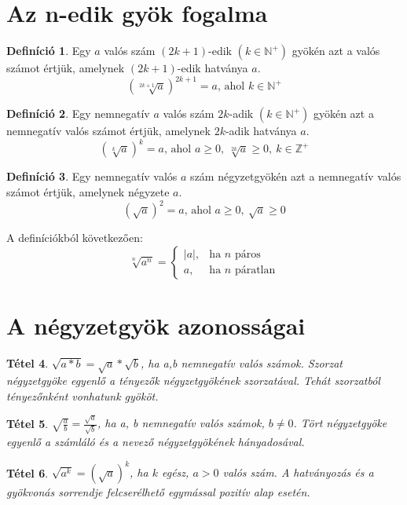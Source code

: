 \documentclass[twoside,12pt]{report}
\newtheorem{theorem}{Tétel}[section]
\theoremstyle{definition}
\newtheorem{definition}[theorem]{Definíció}
\begin{document}
\section{Az n-edik gyök fogalma}
	\begin{definition}
		Egy $a$ valós szám $(2k+1)$-edik $(k\in\mathbb{N}^+)$ gyökén azt a valós számot értjük, amelynek $(2k + 1)$-edik hatványa $a$. 
		\begin{equation*}
		\left(\sqrt[2k+1]{a}\right)^{2k+1}=a\text{, ahol }k\in\mathbb{N}^+
		\end{equation*}
	\end{definition}
	\begin{definition}
		Egy nemnegatív $a$ valós szám $2k$-adik $(k\in\mathbb{N}^+)$ gyökén azt a nemnegatív valós számot értjük, amelynek $2k$-adik hatványa $a$.
		\begin{equation*}
			\left(\sqrt[k]{a}\right)^k=a\text{, ahol } a\ge0,\ \sqrt[2k]{a}\ge0,\ k\in\mathbb{Z}^+
		\end{equation*}
	\end{definition}
	\begin{definition}
		Egy nemnegatív valós $a$ szám négyzetgyökén azt a nemnegatív valós számot értjük,
		amelynek négyzete $a$.
		\begin{equation*}
			\left(\sqrt{a}\right)^2=a\text{, ahol } a\ge0,\ \sqrt{a}\ge0
		\end{equation*}
	\end{definition}
	A definíciókból következően:
	\begin{equation*}
		\sqrt[n]{a^n}=
		\begin{cases}
			|a|, & \text{ha $n$ páros}\\
			a, & \text{ha $n$ páratlan}
		\end{cases}
	\end{equation*}
\section{A négyzetgyök azonosságai}
	\begin{theorem}
		$\sqrt{a*b}=\sqrt{a}*\sqrt{b}$, ha a,b nemnegatív valós számok. Szorzat négyzetgyöke egyenlő a tényezők négyzetgyökének szorzatával. Tehát szorzatból tényezőnként vonhatunk gyököt.
	\end{theorem}
	\begin{theorem}
		$\sqrt{\frac{a}{b}}=\frac{\sqrt{a}}{\sqrt{b}}$, ha a, b nemnegatív valós számok, $b\ne0$. Tört négyzetgyöke egyenlő a számláló és a nevező négyzetgyökének hányadosával.
	\end{theorem}
	\begin{theorem}
		$\sqrt{a^k}=\left(\sqrt{a}\right)^k$, ha $k$ egész, $a>0$ valós szám. A hatványozás és a gyökvonás sorrendje felcserélhető egymással pozitív alap esetén.
	\end{theorem}
\end{document}
